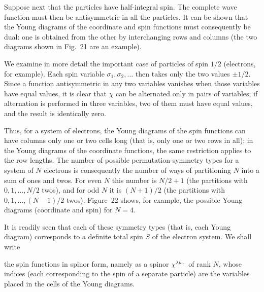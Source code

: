 Suppose next that the particles have half-integral spin. The complete wave function must then be antisymmetric in all the particles. It can be shown that the Young diagrams of the coordinate and spin functions must consequently be dual: one is obtained from the other by interchanging rows and columns (the two diagrams shown in Fig.~21 are an example).

We examine in more detail the important case of particles of spin $1/2$ (electrons, for example). Each spin variable $\sigma_1,\sigma_2,\ldots$ then takes only the two values $\pm1/2$. Since a function antisymmetric in any two variables vanishes when those variables have equal values, it is clear that $\chi$ can be alternated only in pairs of variables; if alternation is performed in three variables, two of them must have equal values, and the result is identically zero.

Thus, for a system of electrons, the Young diagrams of the spin functions can have columns only one or two cells long (that is, only one or two rows in all); in the Young diagrams of the coordinate functions, the same restriction applies to the row lengths. The number of possible permutation-symmetry types for a system of $N$ electrons is consequently the number of ways of partitioning $N$ into a sum of ones and twos. For even $N$ this number is $N/2+1$ (the partitions with $0,1,\ldots,N/2$ twos), and for odd $N$ it is $(N+1)/2$ (the partitions with $0,1,\ldots,(N-1)/2$ twos). Figure~22 shows, for example, the possible Young diagrams (coordinate and spin) for $N=4$.

It is readily seen that each of these symmetry types (that is, each Young diagram) corresponds to a definite total spin $S$ of the electron system. We shall write

the spin functions in spinor form, namely as a spinor $\chi^{\lambda\mu\ldots}$ of rank $N$, whose indices (each corresponding to the spin of a separate particle) are the variables placed in the cells of the Young diagrams.

